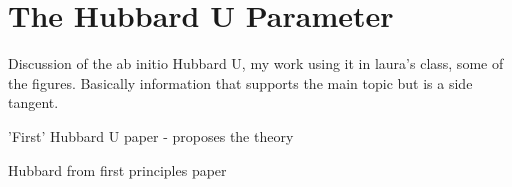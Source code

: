 \singlespacing

\chapter{The Hubbard U Parameter}\label{apx:A}

Discussion of the ab initio Hubbard U, my work using it in laura's class, some of the figures. Basically information that supports the main topic but is a side tangent.

\autocite{anisimovBandTheoryMott1991} 'First' Hubbard U paper - proposes the theory

\autocite{teschHubbardParametersTransition2022} Hubbard from first principles paper

\clearpage